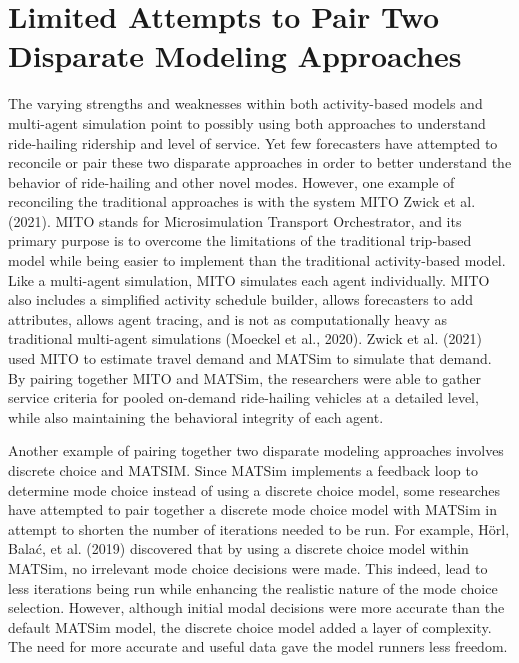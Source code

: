 \documentclass[fancy, masters]{byuthesis}
\begin{document}
\hypertarget{limited-attempts-to-pair-two-disparate-modeling-approaches}{%
\section{Limited Attempts to Pair Two Disparate Modeling Approaches}\label{limited-attempts-to-pair-two-disparate-modeling-approaches}}

The varying strengths and weaknesses within both activity-based models and multi-agent simulation point to possibly using both approaches to understand ride-hailing ridership and level of service. Yet few forecasters have attempted to reconcile or pair these two disparate approaches in order to better understand the behavior of ride-hailing and other novel modes. However, one example of reconciling the traditional approaches is with the system MITO Zwick et al. (2021). MITO stands for Microsimulation Transport Orchestrator, and its primary purpose is to overcome the limitations of the traditional trip-based model while being easier to implement than the traditional activity-based model. Like a multi-agent simulation, MITO simulates each agent individually. MITO also includes a simplified activity schedule builder, allows forecasters to add attributes, allows agent tracing, and is not as computationally heavy as traditional multi-agent simulations (Moeckel et al., 2020). Zwick et al. (2021) used MITO to estimate travel demand and MATSim to simulate that demand. By pairing together MITO and MATSim, the researchers were able to gather service criteria for pooled on-demand ride-hailing vehicles at a detailed level, while also maintaining the behavioral integrity of each agent.

Another example of pairing together two disparate modeling approaches involves discrete choice and MATSIM. Since MATSim implements a feedback loop to determine mode choice instead of using a discrete choice model, some researches have attempted to pair together a discrete mode choice model with MATSim in attempt to shorten the number of iterations needed to be run. For example, Hörl, Balać, et al. (2019) discovered that by using a discrete choice model within MATSim, no irrelevant mode choice decisions were made. This indeed, lead to less iterations being run while enhancing the realistic nature of the mode choice selection. However, although initial modal decisions were more accurate than the default MATSim model, the discrete choice model added a layer of complexity. The need for more accurate and useful data gave the model runners less freedom.
\end{document}
